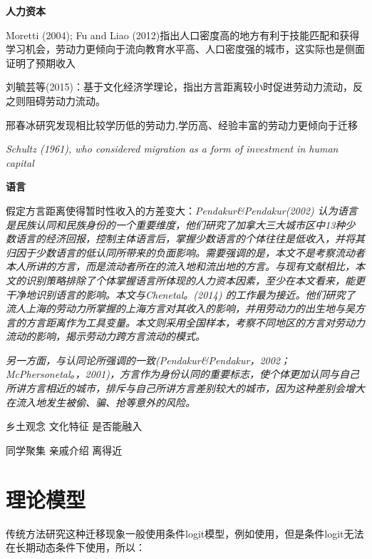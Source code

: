 \documentclass[a4paper,12pt]{article}
\begin{document}
\textbf{人力资本}

Moretti (2004); Fu and Liao (2012)指出人口密度高的地方有利于技能匹配和获得学习机会，劳动力更倾向于流向教育水平高、人口密度强的城市，这实际也是侧面证明了预期收入

刘毓芸等(2015)\cite{LiuYuYunLaoDongLiKuaFangYanLiuDongDeDaoUXingMoShi2015}：基于文化经济学理论，指出方言距离较小时促进劳动力流动，反之则阻碍劳动力流动。

邢春冰研究发现相比较学历低的劳动力,学历高、经验丰富的劳动力更倾向于迁移

\textit{Schultz (1961), who considered migration as a form of investment in human capital}









\textbf{语言}

\cite{LiuYuYunLaoDongLiKuaFangYanLiuDongDeDaoUXingMoShi2015}假定方言距离使得暂时性收入的方差变大：\textit{Pendakur\&Pendakur(2002) 认为语言是民族认同和民族身份的一个重要维度，他们研究了加拿大三大城市区中13种少数语言的经济回报，控制主体语言后，掌握少数语言的个体往往是低收入，并将其归因于少数语言的低认同所带来的负面影响。需要强调的是，本文不是考察流动者本人所讲的方言，而是流动者所在的流入地和流出地的方言。与现有文献相比，本文的识别策略排除了个体掌握语言所体现的人力资本因素，至少在本文看来，能更干净地识别语言的影响。本文与Chenetal。(2014) 的工作最为接近。他们研究了流人上海的劳动力所掌握的上海方言对其收入的影响，并用劳动力的出生地与吴方言的方言距离作为工具变量。本文则采用全国样本，考察不同地区的方言对劳动力流动的影响，揭示劳动力跨方言流动的模式。}

\textit{另一方面，与认同论所强调的一致(Pendakur\&Pendakur，2002；McPhersonetal。，2001)，方言作为身份认同的重要标志，使个体更加认同与自己所讲方言相近的城市，排斥与自己所讲方言差别较大的城市，因为这种差别会增大在流入地发生被偷、骗、抢等意外的风险。}









乡土观念
文化特征
是否能融入

同学聚集
亲戚介绍
离得近



\section{理论模型}
传统方法研究这种迁移现象一般使用条件logit模型，例如\cite{SunWeiZengKongQiWuRanYuLaoDongLiDeKongJianLiuDongJiYuLiuDongRenKouJiuYeXuanZhiXingWeiDeYanJiu2019}使用，但是条件logit无法在长期动态条件下使用，所以：
\end{document}

